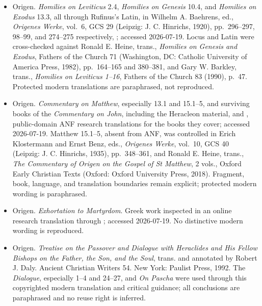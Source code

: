 \begin{itemize}
Curtis,
; accessed 2026-07-19. Its early-twentieth-century English is a research
aid; the publication paraphrases it.
\item Origen. \emph{Homilies on Leviticus} 2.4, \emph{Homilies on Genesis}
10.4, and \emph{Homilies on Exodus} 13.3, all through Rufinus's Latin, in
Wilhelm A. Baehrens, ed., \emph{Origenes Werke}, vol.~6, GCS 29 (Leipzig:
J. C. Hinrichs, 1920), pp.~296--297, 98--99, and 274--275 respectively,
;
accessed 2026-07-19. Locus and Latin were cross-checked against Ronald E.
Heine, trans., \emph{Homilies on Genesis and Exodus}, Fathers of the Church 71
(Washington, DC: Catholic University of America Press, 1982), pp.~164--165 and
380--381, and Gary W. Barkley, trans., \emph{Homilies on Leviticus 1--16},
Fathers of the Church 83 (1990), p.~47. Protected modern translations are
paraphrased, not reproduced.
\item Origen. \emph{Commentary on Matthew}, especially 13.1 and 15.1--5, and
surviving books of the \emph{Commentary on John}, including the Heracleon material,
 and
, public-domain
ANF research translations for the books they cover; accessed 2026-07-19.
Matthew 15.1--5, absent from ANF, was controlled in Erich Klostermann and Ernst
Benz, eds., \emph{Origenes Werke}, vol.~10, GCS 40 (Leipzig: J. C. Hinrichs,
1935), pp.~348--361, and Ronald E. Heine, trans., \emph{The Commentary of Origen on the
Gospel of St Matthew}, 2 vols., Oxford Early Christian Texts (Oxford: Oxford
University Press, 2018). Fragment, book, language, and translation boundaries
remain explicit; protected modern wording is paraphrased.
\item Origen. \emph{Exhortation to Martyrdom}. Greek work inspected in an
online research translation through
; accessed 2026-07-19. No distinctive modern wording is reproduced.
\item Origen. \emph{Treatise on the Passover and Dialogue with Heraclides and
His Fellow Bishops on the Father, the Son, and the Soul}, trans. and annotated
by Robert J. Daly. Ancient Christian Writers 54. New York: Paulist Press, 1992.
The \emph{Dialogue}, especially 1--4 and 24--27, and \emph{On Pascha} were
used through this copyrighted modern translation and critical guidance; all
conclusions are paraphrased and no reuse right is inferred.
\end{itemize}

